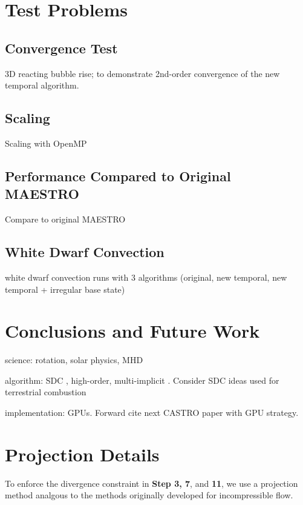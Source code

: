 \documentclass{aastex62}
\begin{document}
\section{Test Problems}

\subsection{Convergence Test}
3D reacting bubble rise; to demonstrate 2nd-order convergence of the new temporal algorithm.

\subsection{Scaling}
Scaling with OpenMP

\subsection{Performance Compared to Original MAESTRO}
Compare to original MAESTRO

\subsection{White Dwarf Convection}
white dwarf convection runs with 3 algorithms (original, new temporal, new temporal + irregular base state)

\section{Conclusions and Future Work}

science: rotation, solar physics, MHD

algorithm: SDC \cite{dutt2000spectral}, high-order, multi-implicit \cite{bourlioux2003high}.
Consider SDC ideas used for terrestrial combustion \cite{pazner2016high,nonaka2018conservative}

implementation: GPUs.  Forward cite next CASTRO paper with GPU strategy.

\appendix
\section{Projection Details}
To enforce the divergence constraint in {\bf Step 3, 7}, and {\bf 11}, we use a projection method analgous to the methods originally developed for incompressible flow.
\end{document}
